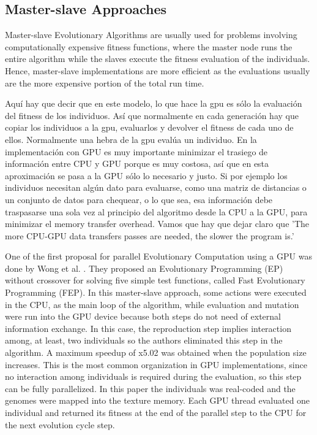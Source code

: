 \documentclass[prodmode,acmtecs]{acmsmall}
\begin{document}
\subsection{Master-slave Approaches}

Master-slave Evolutionary Algorithms are usually used for problems involving computationally expensive fitness functions, where the master node runs the entire algorithm while the slaves execute the fitness evaluation of the individuals. Hence, master-slave implementations are more efficient as the evaluations usually are the more expensive portion of the total run time.

Aquí hay que decir que en este modelo, lo que hace la gpu es sólo la evaluación del fitness de los individuos. Así que normalmente en cada generación hay que copiar los individuos a la gpu, evaluarlos y devolver el fitness de cada uno de ellos. Normalmente una hebra de la gpu evalúa un individuo. En la implementación con GPU es muy importante minimizar el trasiego de información entre CPU y GPU porque es muy costosa, así que en esta aproximación se pasa a la GPU sólo lo necesario y justo. Si por ejemplo los individuos necesitan algún dato para evaluarse, como una matriz de distancias o un conjunto de datos para chequear, o lo que sea, esa información debe traspasarse una sola vez al principio del algoritmo desde la CPU a la GPU, para minimizar el memory transfer overhead.  Vamos que hay que dejar claro que 'The more CPU-GPU data transfers passes are needed, the slower the program is.'



One of the first proposal for parallel Evolutionary Computation using a GPU was done by Wong et al. \cite{man-leung-wong-parallel-2005}. They  proposed an Evolutionary Programming (EP) without crossover for solving five simple test functions, called Fast Evolutionary Programming (FEP). In this master-slave approach, some actions were executed in the CPU, as the main loop of the algorithm, while evaluation and mutation were run into the GPU device because both steps do not need of external information exchange. In this case, the reproduction step implies interaction among, at least, two individuals so the authors eliminated this step in the algorithm. A maximum speedup of x5.02 was obtained when the population size increases. This is the most common organization in GPU implementations, since no interaction among individuals is required during the evaluation, so this step can be fully parallelized. In this paper the individuals was real-coded and the genomes were mapped into the texture memory. Each GPU thread evaluated one individual and returned its fitness at the end of the parallel step to the CPU for the next evolution cycle step.
\end{document}

